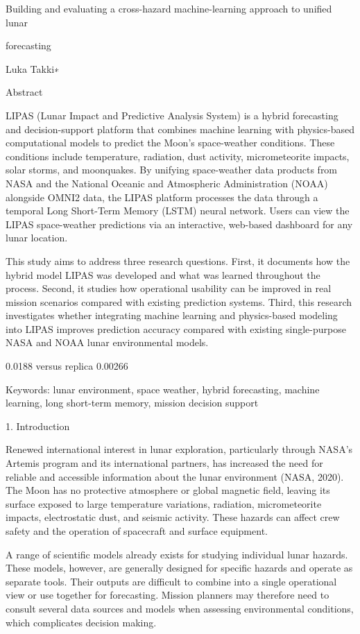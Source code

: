 Building and evaluating a cross-hazard machine-learning approach to unified lunar

forecasting

Luka Takki∗

Abstract

LIPAS (Lunar Impact and Predictive Analysis System) is a hybrid forecasting and decision-support platform that combines machine learning with physics-based computational models to predict the Moon's space-weather conditions. These conditions include temperature, radiation, dust activity, micrometeorite impacts, solar storms, and moonquakes. By unifying space-weather data products from NASA and the National Oceanic and Atmospheric Administration (NOAA) alongside OMNI2 data, the LIPAS platform processes the data through a temporal Long Short-Term Memory (LSTM) neural network. Users can view the LIPAS space-weather predictions via an interactive, web-based dashboard for any lunar location.

This study aims to address three research questions. First, it documents how the hybrid model LIPAS was developed and what was learned throughout the process. Second, it studies how operational usability can be improved in real mission scenarios compared with existing prediction systems. Third, this research investigates whether integrating machine learning and physics-based modeling into LIPAS improves prediction accuracy compared with existing single-purpose NASA and NOAA lunar environmental models.

0.0188 versus replica 0.00266

Keywords: lunar environment, space weather, hybrid forecasting, machine learning, long short-term memory, mission decision support

1. Introduction

Renewed international interest in lunar exploration, particularly through NASA's Artemis program and its international partners, has increased the need for reliable and accessible information about the lunar environment (NASA, 2020). The Moon has no protective atmosphere or global magnetic field, leaving its surface exposed to large temperature variations, radiation, micrometeorite impacts, electrostatic dust, and seismic activity. These hazards can affect crew safety and the operation of spacecraft and surface equipment.

A range of scientific models already exists for studying individual lunar hazards. These models, however, are generally designed for specific hazards and operate as separate tools. Their outputs are difficult to combine into a single operational view or use together for forecasting. Mission planners may therefore need to consult several data sources and models when assessing environmental conditions, which complicates decision making.

